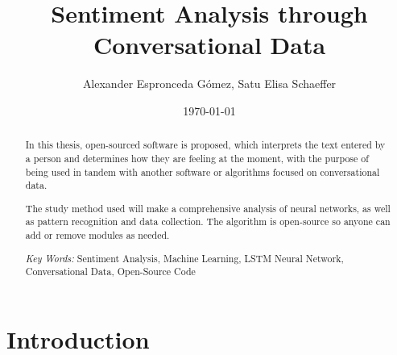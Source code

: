\documentclass[review]{elsarticle} %
\begin{document}
\author{Alexander {Espronceda Gómez}, Satu {Elisa Schaeffer}}

\date{\today}


\let\today\relax
\makeatletter
\def\ps@pprintTitle{%
    \let\@oddhead\@empty
    \let\@evenhead\@empty
    \def\@oddfoot{\footnotesize\itshape
         {} \hfill\today}%
    \let\@evenfoot\@oddfoot
    }
\makeatother

\title{Sentiment Analysis through Conversational Data}
\address{San Nicolás de los Garza, Nuevo León, México}

\begin{abstract}
In this thesis, open-sourced software is proposed, which interprets the text entered by a person and determines how they are feeling at the moment, with the purpose of being used in tandem with another software or algorithms focused on conversational data.

The study method used will make a comprehensive analysis of neural networks, as well as pattern recognition and data collection.
The algorithm is open-source so anyone can add or remove modules as needed.

\vspace*{0.5cm}
\textit{Key Words: } Sentiment Analysis, Machine Learning, LSTM Neural Network, Conversational Data, Open-Source Code


\end{abstract}

\maketitle

\section{Introduction}
\end{document}
